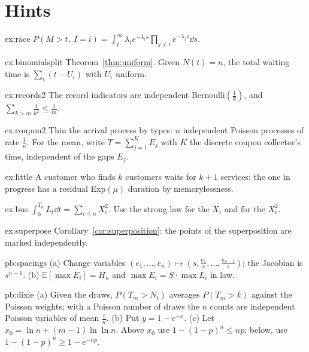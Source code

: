 \section{Hints}

\begin{hint}{ex:race}
$P(M>t,\ I=i)=\int_t^\infty\lambda_ie^{-\lambda_is}\prod_{j\ne i}e^{-\lambda_js}\dd s$.
\end{hint}
\begin{hint}{ex:binomialsplit}
Theorem~\ref{thm:uniform}. Given $N(t)=n$, the total waiting time is $\sum_i(t-U_i)$ with $U_i$ uniform.
\end{hint}
\begin{hint}{ex:records2}
The record indicators are independent Bernoulli$(\frac1k)$, and $\sum_{k>m}\frac1{k^2}\le\frac1m$.
\end{hint}
\begin{hint}{ex:coupon2}
Thin the arrival process by types: $n$ independent Poisson processes of rate $\frac1n$. For the mean, write $T=\sum_{j=1}^K E_j$ with $K$ the discrete
coupon collector's time, independent of the gaps $E_j$.
\end{hint}
\begin{hint}{ex:little}
A customer who finds $k$ customers waits for $k+1$ services; the one in progress has a residual Exp$(\mu)$ duration by memorylessness.
\end{hint}
\begin{hint}{ex:bus}
$\int_0^{T_n}L_t\dd t=\sum_{i\le n}X_i^2$. Use the strong law for the $X_i$ and for the $X_i^2$.
\end{hint}
\begin{hint}{ex:superpose}
Corollary~\ref{cor:superposition}: the points of the superposition are marked independently.
\end{hint}

\begin{hint}{pb:spacings}
(a) Change variables $(e_1,\dots,e_n)\mapsto(s,\frac{e_1}s,\dots,\frac{e_{n-1}}s)$; the Jacobian is $s^{n-1}$. (b) $\mathbb E[\max E_i]=H_n$ and
$\max E_i=S\cdot\max L_i$ in law.
\end{hint}

\begin{hint}{pb:dixie}
(a) Given the draws, $P(T_m>N_t)$ averages $P(T_m>k)$ against the Poisson weights; with a Poisson number of draws the $n$ counts are independent Poisson
variables of mean $\frac tn$. (b) Put $y=1-e^{-x}$. (c) Let $x_0=\ln n+(m-1)\ln\ln n$. Above $x_0$ use $1-(1-p)^n\le np$; below, use $1-(1-p)^n\ge1-e^{-np}$.
\end{hint}

